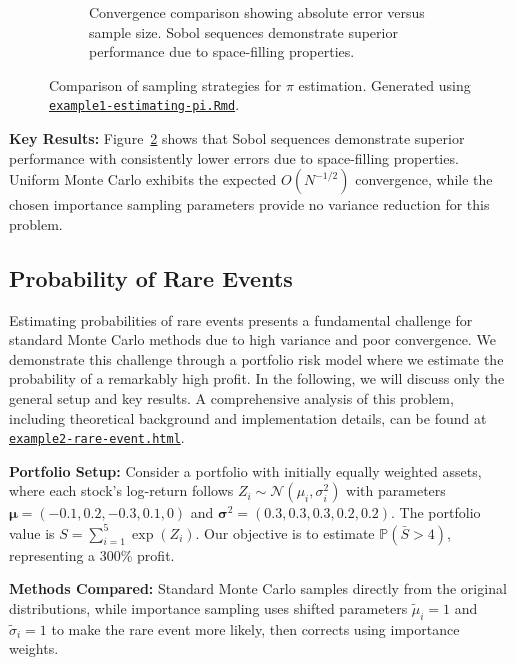 \begin{figure}[h]
\begin{subfigure}[b]{0.48\textwidth}
        \caption{Convergence comparison showing absolute error versus sample size. Sobol sequences demonstrate superior performance due to space-filling properties.}
        \label{fig:ex1-estimation-error}
    \end{subfigure}
    \caption{Comparison of sampling strategies for $\pi$ estimation. Generated using \href{https://github.com/NikoGerman/Seminar/blob/main/Notebooks/example1-estimating-pi.Rmd}{\texttt{example1-estimating-pi.Rmd}}.}
    \label{fig:pi-estimation-comparison}
\end{figure}

\textbf{Key Results:} Figure~\ref{fig:pi-estimation-comparison} shows that Sobol sequences demonstrate superior performance with consistently lower errors due to space-filling properties. Uniform Monte Carlo exhibits the expected $O(N^{-1/2})$ convergence, while the chosen importance sampling parameters provide no variance reduction for this problem.

\subsection{Probability of Rare Events}
\label{rare-events}

Estimating probabilities of rare events presents a fundamental challenge for standard Monte Carlo methods due to high variance and poor convergence. 
We demonstrate this challenge through a portfolio risk model where we estimate the probability of a remarkably high profit. In the following, we will discuss only the general setup and key results.
A comprehensive analysis of this problem, including theoretical background and implementation details, can be found at \href{https://nikogerman.github.io/Seminar/Notebooks/example2-rare-event.html}{\texttt{example2-rare-event.html}}. 

\textbf{Portfolio Setup:} Consider a portfolio with initially equally weighted assets, where each stock's log-return follows $Z_i \sim \mathcal{N}(\mu_i, \sigma_i^2)$ with parameters $\boldsymbol{\mu} = (-0.1, 0.2, -0.3, 0.1, 0)$ and $\boldsymbol{\sigma}^2 = (0.3, 0.3, 0.3, 0.2, 0.2)$. The portfolio value is $S = \sum_{i=1}^5 \exp(Z_i)$. Our objective is to estimate $\mathbb{P}(\bar{S} > 4)$, representing a 300\% profit.

\textbf{Methods Compared:} Standard Monte Carlo samples directly from the original distributions, while importance sampling uses shifted parameters $\tilde{\mu}_i = 1$ and $\tilde{\sigma}_i = 1$ to make the rare event more likely, then corrects using importance weights.

